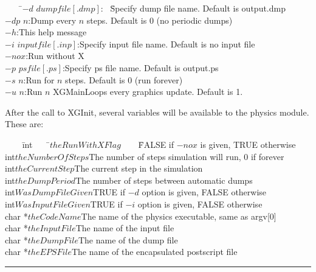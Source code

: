 \begin{tabbing}
\verb+    +\=$-d$ $dumpfile[.dmp]$: \verb+ +\=Specify dump file name. Default is output.dmp \\
\>$-dp$ $n$:\>Dump every $n$ steps. Default is 0 (no periodic dumps) \\
\>$-h$:\>This help message \\
\>$-i$ $inputfile[.inp]$:\>Specify input file name. Default is no input file \\
\>$-nox$:\>Run without X \\
\>$-p$ $psfile[.ps]$:\>Specify ps file name. Default is output.ps \\
\>$-s$ $n$:\>Run for $n$ steps. Default is 0 (run forever) \\
\>$-u$ $n$:\>Run $n$ XGMainLoops every graphics update.  Default is 1. \\
\end{tabbing}

\newpage
After the call to XGInit, several variables will be available to the physics 
module.  These are:

\begin{tabbing}
\verb+    +\=int\verb+    +\=$theRunWithXFlag$\verb+    +\=FALSE if $-nox$ is given, TRUE otherwise \\
\>int\>$theNumberOfSteps$\>The number of steps simulation will run, 0 if forever \\
\>int\>$theCurrentStep$\>The current step in the simulation \\
\>int\>$theDumpPeriod$\>The number of steps between automatic dumps \\
\>int\>$WasDumpFileGiven$\>TRUE if $-d$ option is given, FALSE otherwise \\
\>int\>$WasInputFileGiven$\>TRUE if $-i$ option is given, FALSE otherwise \\
\>char *\>$theCodeName$\>The name of the physics executable, same as argv[0] \\
\>char *\>$theInputFile$\>The name of the input file \\
\>char *\>$theDumpFile$\>The name of the dump file \\
\>char *\>$theEPSFile$\>The name of the encapsulated postscript file
\end{tabbing}

\def\xlen{4in}
\begin{minipage}{\xlen}
\begin{flushright}
\rule{\xlen}{.5pt}
\end{flushright}
\end{minipage}

